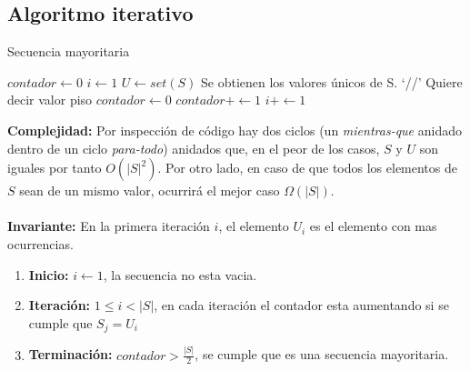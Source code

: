 \documentclass[]{article}
\begin{document}
\subsection{Algoritmo iterativo}
\begin{algorithm}[H]
    \caption{Secuencia mayoritaria}
    \begin{algorithmic}[1]
        \State$contador \gets 0$
        \State$i \gets 1$
        \State $U \gets  set(S)$ \Comment Se obtienen los valores únicos de S.
         \Comment `//' Quiere decir valor piso
        \State$contador \gets 0$
        \State$contador+\gets 1$
        \EndIf
        \State$i+\gets 1$
        \EndFor
        \EndWhile
        \State {}
        \Else
        \State {}
        \EndIf
        \EndProcedure
    \end{algorithmic}
\end{algorithm}
\textbf{Complejidad:} Por inspección de código hay dos ciclos (un \textit{mientras-que} anidado dentro de un ciclo \textit{para-todo}) anidados que, en el peor de los casos, $S$ y $U$ son iguales por tanto $O(|S|^{2}).$ Por otro lado, en caso de que todos los elementos de $S$ sean de un mismo valor, ocurrirá el mejor caso  $\Omega(|S|)$.\\
\textbf{\\Invariante:}
En la primera iteración $i$, el elemento $U_i$ es el elemento con mas ocurrencias.
\begin{enumerate}
    \item \textbf{Inicio:}  $i \gets 1$, la secuencia no esta vacia.
    \item \textbf{Iteración:} $1 \leq i < |S|$, en cada iteración el contador esta aumentando si se cumple que $S_j = U_i$
    \item \textbf{Terminación:} $contador > \frac{|S|}{2}$, se cumple que es una secuencia mayoritaria.
\end{enumerate}
\end{document}
